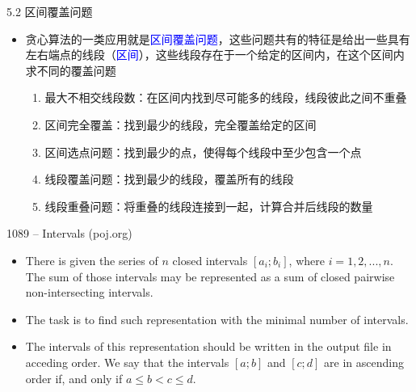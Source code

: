 \begin{frame}{5.2 区间覆盖问题}
    \begin{itemize}
        \item 贪心算法的一类应用就是\textcolor{blue}{区间覆盖问题}，这些问题共有的特征是给出一些具有左右端点的线段（\textcolor{blue}{区间}），这些线段存在于一个给定的区间内，在这个区间内求不同的覆盖问题
        \begin{enumerate}[(1)]
            \item 最大不相交线段数：在区间内找到尽可能多的线段，线段彼此之间不重叠
            \item 区间完全覆盖：找到最少的线段，完全覆盖给定的区间
            \item 区间选点问题：找到最少的点，使得每个线段中至少包含一个点
            \item 线段覆盖问题：找到最少的线段，覆盖所有的线段
            \item 线段重叠问题：将重叠的线段连接到一起，计算合并后线段的数量
        \end{enumerate}
    \end{itemize}
\end{frame}
\begin{frame}{1089 -- Intervals (poj.org)}
    \begin{itemize}
        \item There is given the series of $n$ closed intervals $[a_i; b_i]$, where $i=1,2,...,n$. The sum of those intervals may be represented as a sum of closed pairwise non-intersecting intervals.
        \item The task is to find such representation with the minimal number of intervals. 
        \item The intervals of this representation should be written in the output file in acceding order. We say that the intervals $[a; b]$ and $[c; d]$ are in ascending order if, and only if $a \leq b < c \leq d$.
    \end{itemize}
\end{frame}    
